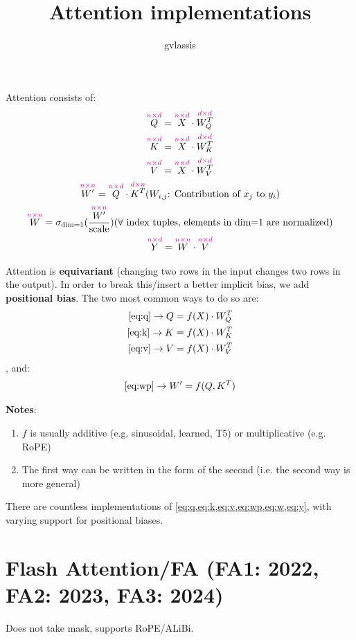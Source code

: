 \documentclass{article}
\title{Attention implementations}
\author{gvlassis}
\date{}
\newcommand{\dm}[3]{
    \overset{\textcolor{magenta}{#2 \times #3}}{#1}
}
\begin{document}
\maketitle

Attention consists of:
\begin{gather}
    \dm{Q}{n}{d} = \dm{X}{n}{d} \cdot \dm{W^{T}_{Q}}{d}{d} \label{eq:q}\\
    \dm{K}{n}{d} = \dm{X}{n}{d} \cdot \dm{W^{T}_{K}}{d}{d} \label{eq:k}\\
    \dm{V}{n}{d} = \dm{X}{n}{d} \cdot \dm{W^{T}_{V}}{d}{d} \label{eq:v}\\
    \dm{W^\prime}{n}{n} = \dm{Q}{n}{d} \cdot \dm{K^T}{d}{n} \text{($W_{i,j}$: Contribution of $x_j$ to $y_i$)}\label{eq:wp}\\
    \dm{W}{n}{n} = \sigma_{\text{dim=1}} (\frac{\dm{W^\prime}{n}{n}}{\text{scale}}) \text{($\forall$ index tuples, elements in dim=1 are normalized)} \label{eq:w}\\
    \dm{Y}{n}{d} = \dm{W}{n}{n} \cdot \dm{V}{n}{d} \label{eq:y}
\end{gather}

Attention is \textbf{equivariant} (changing two rows in the input changes two rows in the output). In order to break this/insert a better implicit bias, we add \textbf{positional bias}. The two most common ways to do so are:
\begin{align*}
    \text{\eqref{eq:q}} \rightarrow Q = f(X) \cdot W^{T}_{Q}\\
    \text{\eqref{eq:k}} \rightarrow K = f(X) \cdot W^{T}_{K}\\
    \text{\eqref{eq:v}} \rightarrow V = f(X) \cdot W^{T}_{V}
\end{align*}
, and:
\begin{align*}
    \text{\eqref{eq:wp}} \rightarrow W^\prime = f(Q,K^T)
\end{align*}

{\large \textbf{Notes}:}
\begin{enumerate}
    \item $f$ is usually additive (e.g. sinusoidal, learned, T5) or multiplicative (e.g. RoPE)
    \item The first way can be written in the form of the second (i.e. the second way is more general)
\end{enumerate}

There are countless implementations of \cref{eq:q,eq:k,eq:v,eq:wp,eq:w,eq:y}, with varying support for positional biases.

\section{Flash Attention/FA (FA1: 2022, FA2: 2023, FA3: 2024)}
Does not take mask, supports RoPE/ALiBi.
\end{document}
